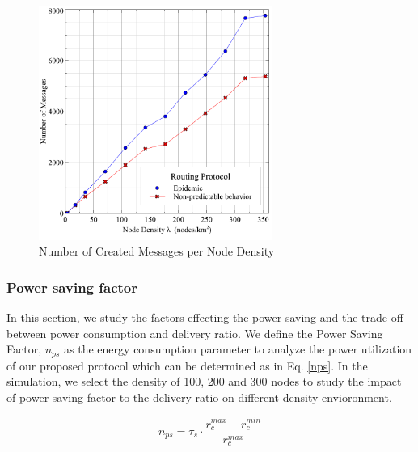 \begin{figure}[!t]
	\centering
	\includegraphics[width=3in]{Graphs/messages.pdf}
	\caption{Number of Created Messages per Node Density}
	\label{Number of Created Messages per Node Density}
\end{figure}

\subsubsection{Power saving factor}


In this section, we study the factors effecting the power saving and the trade-off between power consumption and delivery ratio.
We define the Power Saving Factor, $n_{ps}$ as the energy consumption parameter to analyze the power utilization of our proposed protocol which can be determined as in Eq. \ref{nps}.
In the simulation, we select the density of 100, 200 and 300 nodes to study the impact of power saving factor to the delivery ratio on different density envioronment.

\begin{equation}
{ n }_{ ps }={ \tau  }_{ s }\cdot \frac { { r }_{ c }^{ max }-{ r }_{ c }^{ min } }{ { r }_{ c }^{ max } } 
\label{nps}
\end{equation}

